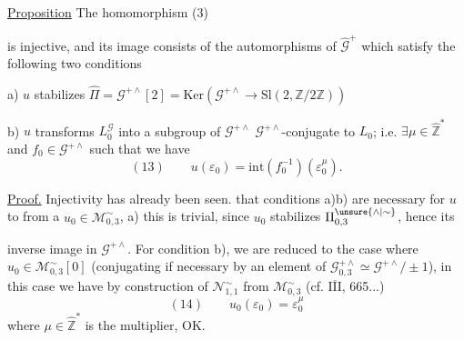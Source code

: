 \uline{Proposition} The homomorphism (3)


is injective, and its image consists of the
automorphisms of $\widehat{\mathcal{G}}^{+}$ which satisfy the following
two conditions

a) $u$ stabilizes $\widehat{\Pi}=\mathcal{G}^{+\wedge}[2]
=\mathrm{Ker}(\mathcal{G}^{+\wedge}\longrightarrow\mathrm{Sl}(2,\mathbb{Z}/2\mathbb{Z}))$

b) $u$ transforms $L_{0}^{\mathcal{G}}$ into a subgroup of $\mathcal{G}^{+\wedge}$
$\mathcal{G}^{+\wedge}$-conjugate to $L_{0}$; i.e.
$\exists\mu\in\widehat{\mathbb{Z}}^{*}$ and $f_{0}\in\mathcal{G}^{+\wedge}$
such that we have
\[
(13)\qquad u(\varepsilon_{0})=\mathrm{int}(f_{0}^{-1})(\varepsilon_{0}^{\mu}).
\]

\uline{Proof.} Injectivity has already been seen.
that conditions a)b) are necessary for
$u$ to 
from a $u_{0}\in\mathcal{M}_{0,3}^{\sim}$,
 a) this is trivial, since $u_{0}$ stabilizes
$\Pi_{0,3}^{\unsure{\wedge|\sim}}$, hence its




inverse image in $\mathcal{G}^{+\wedge}$. For condition
b), we are reduced to the case where $u_{0}\in\mathcal{M}_{0,3}^{\sim}[0]$
(conjugating if necessary by an element of
$\mathcal{G}_{0,3}^{+\wedge}\simeq\mathcal{G}^{+\wedge}/\!\pm1$),
in this case we have by construction of $\mathcal{N}_{1,1}^{\sim}$ from
$\mathcal{M}_{0,3}^{\sim}$ (cf. \uline{\(\overline{\mathrm{III}}\)},  665...)
\[
(14)\qquad u_{0}(\varepsilon_{0})=\varepsilon_{0}^{\mu}
\]
where $\mu\in\widehat{\mathbb{Z}}^{*}$ is the multiplier, OK.

